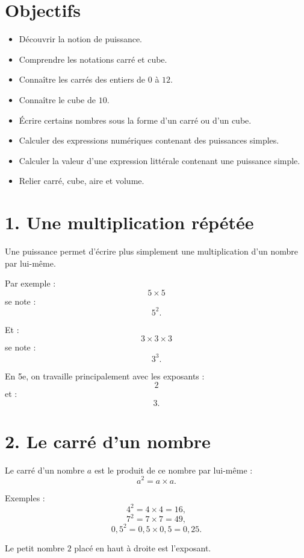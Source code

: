 
\section{Objectifs}

\begin{itemize}
\item Découvrir la notion de puissance.
\item Comprendre les notations carré et cube.
\item Connaître les carrés des entiers de $0$ à $12$.
\item Connaître le cube de $10$.
\item Écrire certains nombres sous la forme d'un carré ou d'un cube.
\item Calculer des expressions numériques contenant des puissances simples.
\item Calculer la valeur d'une expression littérale contenant une puissance simple.
\item Relier carré, cube, aire et volume.
\end{itemize}

\section{1. Une multiplication répétée}

Une puissance permet d'écrire plus simplement une multiplication d'un nombre par lui-même.

Par exemple :
\[
5\times5
\]
se note :
\[
5^2.
\]

Et :
\[
3\times3\times3
\]
se note :
\[
3^3.
\]

En 5e, on travaille principalement avec les exposants :
\[
2
\]
et :
\[
3.
\]

\section{2. Le carré d'un nombre}

\begin{definition}
Le carré d'un nombre $a$ est le produit de ce nombre par lui-même :
\[
\boxed{a^2=a\times a}.
\]
\end{definition}

Exemples :
\[
4^2=4\times4=16,
\]
\[
7^2=7\times7=49,
\]
\[
0{,}5^2=0{,}5\times0{,}5=0{,}25.
\]

Le petit nombre $2$ placé en haut à droite est l'exposant.

